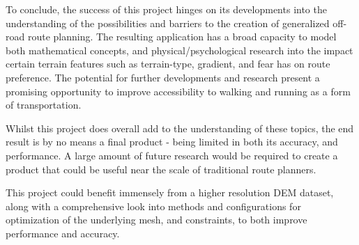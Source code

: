 \documentclass[12pt]{article}
\begin{document}
To conclude, the success of this project hinges on its developments into the understanding of the possibilities and barriers to the creation of generalized off-road route planning. The resulting application has a broad capacity to model both mathematical concepts, and physical/psychological research into the impact certain terrain features such as terrain-type, gradient, and fear has on route preference. The potential for further developments and research present a promising opportunity to improve accessibility to walking and running as a form of transportation.

Whilst this project does overall add to the understanding of these topics, the end result is by no means a final product - being limited in both its accuracy, and performance. A large amount of future research would be required to create a product that could be useful near the scale of traditional route planners.

This project could benefit immensely from a higher resolution DEM dataset, along with a comprehensive look into methods and configurations for optimization of the underlying mesh, and constraints, to both improve performance and accuracy.

\pagebreak

\nocite{esa2024dem}
\nocite{cgal:eb-24b}
\nocite{rouault_2022_6517191}
\nocite{wiki:osm}
\nocite{gtest}
\nocite{fmtlib}
\nocite{opencv_library}
\nocite{oneTBB}
\nocite{tin_terrain_logging}
\nocite{libboost}
\nocite{geographiclib}

\printbibliography[heading=bibnumbered]{}
\end{document}
